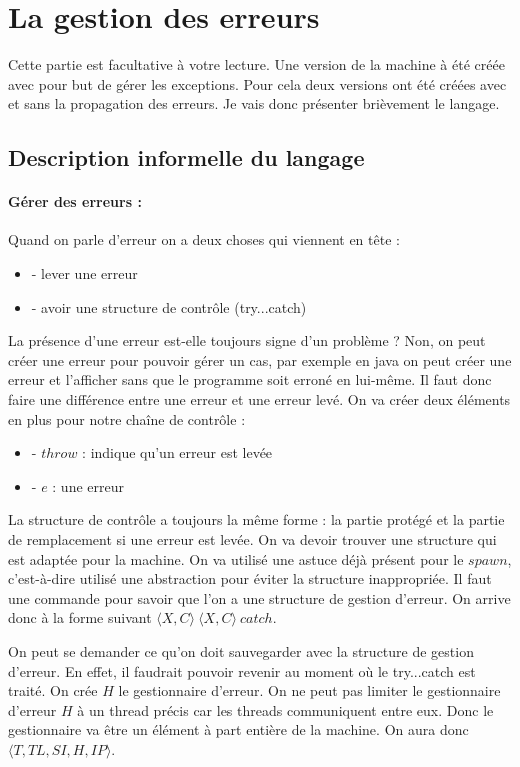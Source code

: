 \documentclass[10pt,a4paper]{report}
\begin{document}
\section{La gestion des erreurs}

Cette partie est facultative à votre lecture. Une version de la machine à été créée avec pour but de gérer les exceptions. Pour cela deux versions ont été créées avec et sans la propagation des erreurs. Je vais donc présenter brièvement le langage.

\subsection{Description informelle du langage}

\paragraph{Gérer des erreurs :} Quand on parle d'erreur on a deux choses qui viennent en tête :
\begin{itemize}
\item[] - lever une erreur
\item[] - avoir une structure de contrôle (try...catch)
\end{itemize}
La présence d'une erreur est-elle toujours signe d'un problème ? Non, on peut créer une erreur pour pouvoir gérer un cas, par exemple en java on peut créer une erreur et l'afficher sans que le programme soit erroné en lui-même. Il faut donc faire une différence entre une erreur et une erreur levé. On va créer deux éléments en plus pour notre chaîne de contrôle :
\begin{itemize}
\item[] - $throw$ : indique qu'un erreur est levée
\item[] - $e$ : une erreur
\end{itemize} 
La structure de contrôle a toujours la même forme : la partie protégé et la partie de remplacement si une erreur est levée. On va devoir trouver une structure qui est adaptée pour la machine. On va utilisé une astuce déjà présent pour le $spawn$, c'est-à-dire utilisé une abstraction pour éviter la structure inappropriée. Il faut une commande pour savoir que l'on a une structure de gestion d'erreur. On arrive donc à la forme suivant $\langle X,C\rangle~\langle X,C\rangle~catch$.
\medbreak

On peut se demander ce qu'on doit sauvegarder avec la structure de gestion d'erreur. En effet, il faudrait pouvoir revenir au moment où le try...catch est traité. On crée $H$ le gestionnaire d'erreur. On ne peut pas limiter le gestionnaire d'erreur $H$ à un thread précis car les threads communiquent entre eux. Donc le gestionnaire va être un élément à part entière de la machine. On aura donc $\langle T,TL,SI,H,IP\rangle$.
\end{document}

